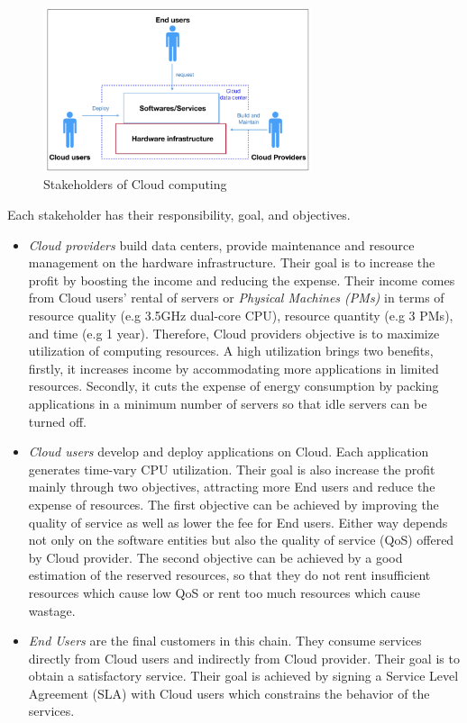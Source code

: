\begin{figure}[H]
	\centering
	\includegraphics[width=0.7\textwidth]{pics/stakeholders.png}
	\caption{Stakeholders of Cloud computing}
	\label{fig:stakeholders}
\end{figure}
Each stakeholder has their responsibility, goal, and objectives. 
\begin{itemize}
	\item \emph{Cloud providers} build data centers, provide maintenance and resource management on the hardware infrastructure. Their goal is to increase the profit by boosting the income and reducing the expense. Their income comes from Cloud users' rental of servers or \emph{Physical Machines (PMs)} in terms of resource quality (e.g  3.5GHz dual-core CPU), resource quantity (e.g 3 PMs), and time (e.g 1 year). Therefore, Cloud providers objective is to maximize utilization of computing resources. A high utilization brings two benefits, firstly, it increases income by accommodating more applications in limited resources. Secondly, it cuts the expense of energy consumption by packing applications in a minimum number of servers so that idle servers can be turned off. 	
	\item \emph{Cloud users} develop and deploy applications on Cloud. Each application generates time-vary CPU utilization. Their goal is also increase the profit mainly through two objectives, attracting more End users and reduce the expense of resources. The first objective can be achieved by improving the quality of service as well as lower the fee for End users. Either way depends not only on the software entities but also the quality of service (QoS) offered by Cloud provider. The second objective can be achieved by a good estimation of the reserved resources, so that they do not rent insufficient resources which cause low QoS or rent too much resources which cause wastage.
	\item \emph{End Users} are the final customers in this chain. They consume services directly from Cloud users and indirectly from Cloud provider. Their goal is to obtain a satisfactory service. Their goal is achieved by signing a Service Level Agreement (SLA) with Cloud users which constrains the behavior of  the services.
\end{itemize}

